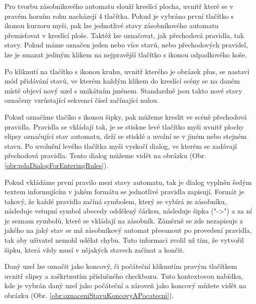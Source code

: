 Pro tvorbu zásobníkového automatu slouží kreslící plocha, uvnitř které se v pravém horním rohu nacházejí 4 tlačítka. Pokud je vybráno první tlačítko s ikonou kurzoru myši, pak lze jednotlivé stavy zásobníkového automatu přemisťovat v kreslící ploše. Taktéž lze označovat, jak přechodová pravidla, tak stavy. Pokud máme označen jeden nebo více stavů, nebo přechodových pravidel, lze je smazat jediným klikem na nejpravější tlačítko s ikonou odpadkového koše.

Po kliknutí na tlačítko s ikonou kruhu, uvnitř kterého je obrázek plus, se nastaví mód přidávání stavů, ve kterém každým klikem do kreslící scény se na daném místě objeví nový uzel s unikátním jménem. Standardně jsou takto nové stavy označeny vzrůstající sekvencí čísel začínající nulou.

Pokud označíme tlačíko s ikonou šipky, pak můžeme kreslit ve scéně přechodová pravidla. Pravidla se vkládají tak, je se stiskne levé tlačítko myši uvnitř plochy elipsy označující stav automatu, drží se stisklé a uvolní se v jiném nebo stejném stavu. Po uvolnění levého tlačítka myši vyskočí dialog, ve kterém se zadávají přechodová pravidla. Tento dialog můžeme vidět na obrázku (Obr. \ref{obr:pdaDialogForEnteringRules}). 


Pokud vkládáme první pravilo mezi stavy automatu, tak je dialog vyplněn šedým textem informujícím v jakém formátu se jednotlivé pravidla zapisují.
Formát je takový, že každé pravidlo začíná symbolem, který se vybírá ze zásobníku, následuje vstupní symbol abecedy oddělený čárkou, následuje šipka ("->") a za ní je seznam symbolů, které se vkládají na zásobník. Záměrně se zde nezapisuje z jakého na jaký stav se má zásobníkový automat přesunout po provedení pravidla, tak aby uživatel nemohl udělat chybu. Tuto informaci zvolil už tím, že vytvořil šipku, která vždy musí v nějakých stavech začínat a končit.

Daný uzel lze označit jako koncový, či počáteční kliknutím pravým tlačítkem uvnitř elipsy a zaškrtnutím příslušného checkboxu. Tuto kontextovou nabídku, kde je vybrán daný uzel jako počáteční a zároveň jako koncový můžete vidět na obrázku (Obr. \ref{obr:oznaceniStavuKoncovyAPocatecni}).


